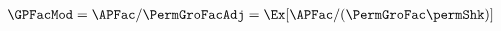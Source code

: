   \begin{align}
    \GPFacMod  & = \APFac/\PermGroFacAdj = \Ex[\APFac/(\PermGroFac\permShk)]  \label{eq:GPFacModDefn}
  \end{align}
